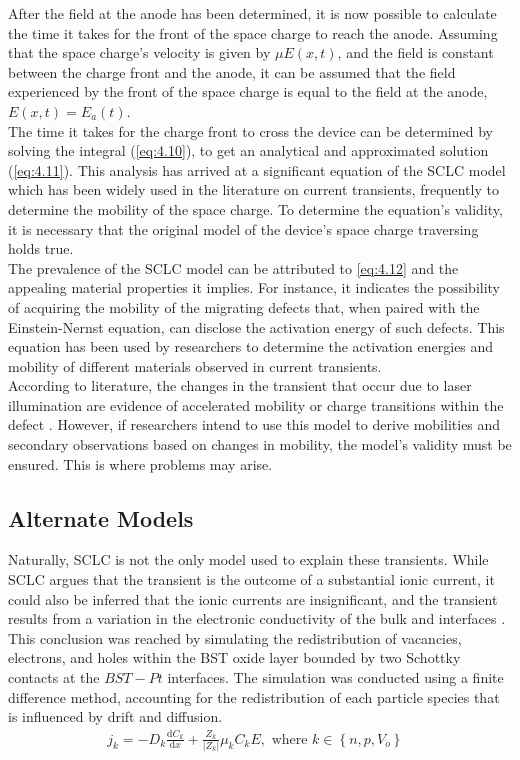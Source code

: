 \noindent After the field at the anode has been determined, it is now possible to calculate the time it takes for the front of the space charge to reach the anode. Assuming that the space charge's velocity is given by $\mu E(x,t)$, and the field is constant between the charge front and the anode, it can be assumed that the field experienced by the front of the space charge is equal to the field at the anode, $E(x,t) = E_a(t)$. \\

\noindent The time it takes for the charge front to cross the device can be determined by solving the integral (\ref{eq:4.10}), to get an analytical and approximated solution (\ref{eq:4.11}). This analysis has arrived at a significant equation of the SCLC model which has been widely used in the literature on current transients, frequently to determine the mobility of the space charge. To determine the equation's validity, it is necessary that the original model of the device's space charge traversing holds true. \\

\noindent The prevalence of the SCLC model can be attributed to \ref{eq:4.12} and the appealing material properties it implies. For instance, it indicates the possibility of acquiring the mobility of the migrating defects that, when paired with the Einstein-Nernst equation, can disclose the activation energy of such defects. This equation has been used by researchers to determine the activation energies and mobility of different materials observed in current transients. \\

\noindent According to literature, the changes in the transient that occur due to laser illumination are evidence of accelerated mobility \cite{li2015visible} or charge transitions within the defect \cite{lee2019charge}. However, if researchers intend to use this model to derive mobilities and secondary observations based on changes in mobility, the model's validity must be ensured. This is where problems may arise.

\subsection[Alternate Models]{Alternate Models}

Naturally, SCLC is not the only model used to explain these transients. While SCLC argues that the transient is the outcome of a substantial ionic current, it could also be inferred that the ionic currents are insignificant, and the transient results from a variation in the electronic conductivity of the bulk and interfaces \cite{meyer2005oxygen}. This conclusion was reached by simulating the redistribution of vacancies, electrons, and holes within the BST oxide layer bounded by two Schottky contacts at the $BST-Pt$ interfaces. The simulation was conducted using a finite difference method, accounting for the redistribution of each particle species that is influenced by drift and diffusion. 
\begin{align}
    j_k = -D_k\frac{\mathrm{d} C_k}{\mathrm{d} x} + \frac{Z_k}{|Z_k|} \mu_k C_k E , \mbox{ where $k \in \left \{ n,p,V_{\ddot{o}} \right \}$ } \label{eq:4.13} 
\end{align}


